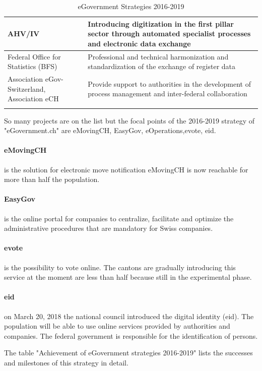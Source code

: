 \begin{longtable}[ c ]{| m{4.5cm} | m{9cm}|}
 AHV/IV & Introducing digitization in the first pillar sector through automated specialist processes and electronic data exchange\\ \hline
 Federal Office for Statistics (BFS) & Professional and technical harmonization and standardization of the exchange of register data\\ \hline
 Association eGov-Switzerland, Association eCH & Provide support to authorities in the development of process management and inter-federal collaboration\\ \hline
 \caption{eGovernment Strategies 2016-2019 \cite{eGov2016Strat}}
 \label{tab:eGovernment Strategies 2016-2019}\\
\end{longtable}
So many projects are on the list but the focal points of the 2016-2019 strategy of "eGovernment.ch" are eMovingCH, EasyGov, eOperations,\acrshort{evote}, \acrshort{eid}.

\paragraph{eMovingCH} is the solution for electronic move notification eMovingCH is now reachable for more than half the population.
\paragraph{EasyGov} is the online portal for companies to centralize, facilitate and optimize the administrative procedures that are mandatory for Swiss companies.
\paragraph{\acrshort{evote}} is the possibility to vote online. The cantons are gradually introducing this service at the moment are less than half because still in the experimental phase.
\paragraph{\acrshort{eid}}
on March 20, 2018 the national council introduced the digital identity (\acrshort{eid}). The population will be able to use online services provided by authorities and companies.
The federal government is responsible for the identification of persons.

The table "Achievement of eGovernment strategies 2016-2019" lists the successes and milestones of this strategy in detail.

